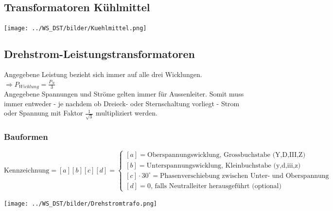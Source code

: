 \newpage
	\subsection{Transformatoren Kühlmittel}
		\begin{center}
	    	\texttt{[image: ../WS\_DST/bilder/Kuehlmittel.png]}
	    \end{center} 

	\subsection{Drehstrom-Leistungstransformatoren} 
	Angegebene Leistung bezieht sich immer auf alle drei Wicklungen. $\Rightarrow P_{Wicklung} =
	\frac{P_N}{3}$ \\
	Angegebene Spannungen und Ströme gelten immer für Aussenleiter. Somit muss immer entweder - je
 nachdem ob Dreieck- oder Sternschaltung vorliegt -	Strom oder Spannung mit Faktor
 $\frac{1}{\sqrt{3}}$ multipliziert werden.
 	\subsubsection{Bauformen}
	 $$\text{Kennzeichnung} = [a][b][c][d] = \begin{cases}
                  [a] = \text{Oberspannungswicklung, Grossbuchstabe (Y,D,III,Z)
                  }\\
                  [b] = \text{Unterspannungswicklung, Kleinbuchstabe (y,d,iii,z) } \\
                  [c] \cdot 30^\circ = \text{Phasenverschiebung zwischen Unter- und Oberspannung }
                  \\ [d] = 0 \text{, falls Neutralleiter herausgeführt (optional)}
                  \end{cases}$$
		\begin{center}
	    	\texttt{[image: ../WS\_DST/bilder/Drehstromtrafo.png]}
	    \end{center} 

